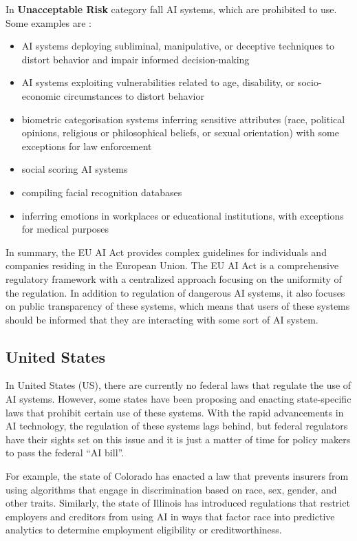 In \textbf{Unacceptable Risk} category fall AI systems, which are prohibited to use. Some examples are \cite{eu_ai_act_summary}:
\begin{itemize}
    \item AI systems deploying subliminal, manipulative, or deceptive techniques to distort behavior and impair informed decision-making
    \item AI systems exploiting vulnerabilities related to age, disability, or socio-economic circumstances to distort behavior
    \item biometric categorisation systems inferring sensitive attributes (race, political opinions, religious or philosophical beliefs, or sexual orientation) with some exceptions for law enforcement
    \item social scoring AI systems
    \item compiling facial recognition databases
    \item inferring emotions in workplaces or educational institutions, with exceptions for medical purposes
\end{itemize}

In summary, the EU AI Act provides complex guidelines for individuals and companies residing in the European Union. The EU AI Act is a comprehensive regulatory framework with a centralized approach focusing on the uniformity of the regulation. In addition to regulation of dangerous AI systems, it also focuses on public transparency of these systems, which means that users of these systems should be informed that they are interacting with some sort of AI system.

\subsection{United States}
In United States (US), there are currently no federal laws that regulate the use of AI systems. However, some states have been proposing and enacting state-specific laws that prohibit certain use of these systems. With the rapid advancements in AI technology, the regulation of these systems lags behind, but federal regulators have their sights set on this issue and it is just a matter of time for policy makers to pass the federal ``AI bill''.

For example, the state of Colorado has enacted a law that prevents insurers from using algorithms that engage in discrimination based on race, sex, gender, and other traits. Similarly, the state of Illinois has introduced regulations that restrict employers and creditors from using AI in ways that factor race into predictive analytics to determine employment eligibility or creditworthiness.~\cite{Parinandi_Crosson_Peterson_Nadarevic_2024}

